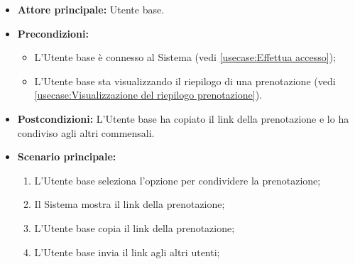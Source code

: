 \label{usecase:Condividi la prenotazione}
\begin{itemize}
	\item \textbf{Attore principale:} Utente base.

	\item \textbf{Precondizioni:}
	\begin{itemize}
		\item L'Utente base è connesso al Sistema (vedi \autoref{usecase:Effettua accesso});
		\item L'Utente base sta visualizzando il riepilogo di una prenotazione (vedi \autoref{usecase:Visualizzazione del riepilogo prenotazione}).
	\end{itemize}

	\item \textbf{Postcondizioni:}
	      L'Utente base ha copiato il link della prenotazione e lo ha condiviso agli altri commensali.

	\item \textbf{Scenario principale:}
	      \begin{enumerate}
		      \item L'Utente base seleziona l'opzione per condividere la prenotazione;
		      \item Il Sistema mostra il link della prenotazione;
		      \item L'Utente base copia il link della prenotazione;
		      \item L'Utente base invia il link agli altri utenti;
	      \end{enumerate}
\end{itemize}